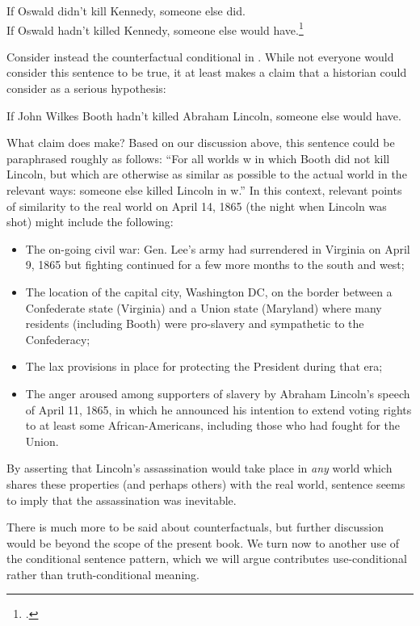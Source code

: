 \ea \label{ex:19.38}
\ea  If Oswald didn’t kill Kennedy, someone else did. \\
\ex If Oswald hadn’t killed Kennedy, someone else would have.\footnote{\citet{Adams1970}.}
                       \z
\z


Consider instead the counterfactual conditional in . While not everyone would consider this sentence to be true, it at least makes a claim that a historian could consider as a serious hypothesis:


\ea \label{ex:19.39}
If John Wilkes Booth hadn’t killed Abraham Lincoln, someone else would have.
\z


What claim does  make? Based on our discussion above, this sentence could be paraphrased roughly as follows: “For all worlds w in which Booth did not kill Lincoln, but which are otherwise as similar as possible to the actual world in the relevant ways: someone else killed Lincoln in w.” In this context, relevant points of similarity to the real world on April 14, 1865 (the night when Lincoln was shot) might include the following:

\begin{itemize}
\item The on-going civil war: Gen. Lee’s army had surrendered in Virginia on April 9, 1865 but fighting continued for a few more months to the south and west;
\item The location of the capital city, Washington DC, on the border between a Confederate state (Virginia) and a Union state (Maryland) where many residents (including Booth) were pro-slavery and sympathetic to the Confederacy;
\item The lax provisions in place for protecting the President during that era;
\item The anger aroused among supporters of slavery by Abraham Lincoln’s speech of April 11, 1865, in which he announced his intention to extend voting rights to at least some African-Americans, including those who had fought for the Union.
\end{itemize}

By asserting that Lincoln’s assassination would take place in \textit{any} world which shares these properties (and perhaps others) with the real world, sentence  seems to imply that the assassination was inevitable.



There is much more to be said about counterfactuals, but further discussion would be beyond the scope of the present book. We turn now to another use of the conditional sentence pattern, which we will argue contributes use-conditional rather than truth-conditional meaning.


